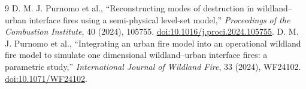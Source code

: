 \begin{thebibliography}{9}
 D. M. J. Purnomo et al., ``Reconstructing modes of destruction in wildland--urban interface fires using a semi-physical level-set model,'' \emph{Proceedings of the Combustion Institute}, 40 (2024), 105755. \href{https://doi.org/10.1016/j.proci.2024.105755}{doi:10.1016/j.proci.2024.105755}.
 D. M. J. Purnomo et al., ``Integrating an urban fire model into an operational wildland fire model to simulate one dimensional wildland--urban interface fires: a parametric study,'' \emph{International Journal of Wildland Fire}, 33 (2024), WF24102. \href{https://doi.org/10.1071/WF24102}{doi:10.1071/WF24102}.
\end{thebibliography}
